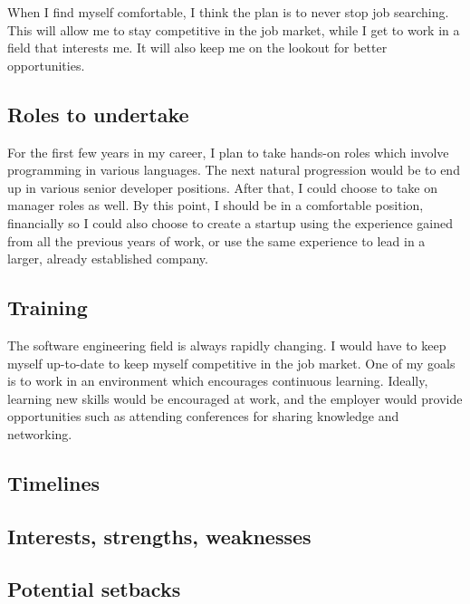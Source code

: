 When I find myself comfortable, I think the plan is to never stop job searching.
This will allow me to stay competitive in the job market\cite{kleiman_2015},
while I get to work in a field that interests me. It will also keep me on the
lookout for better opportunities.


\subsection{Roles to undertake}
For the first few years in my career, I plan to take hands-on roles which
involve programming in various languages. The next natural progression would be
to end up in various senior developer positions. After that, I could choose to
take on manager roles as well. By this point, I should be in a comfortable
position, financially so I could also choose to create a startup using the
experience gained from all the previous years of work, or use the same
experience to lead in a larger, already established company.

\subsection{Training}
The software engineering field is always rapidly changing. I would have to keep
myself up-to-date to keep myself competitive in the job market. One of my goals
is to work in an environment which encourages continuous learning. Ideally,
learning new skills would be encouraged at work, and the employer would provide
opportunities such as attending conferences for sharing knowledge and
networking. 

\subsection{Timelines}

\subsection{Interests, strengths, weaknesses}

\subsection{Potential setbacks}
